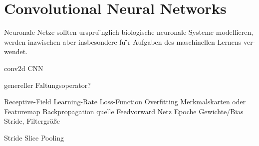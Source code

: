\section{Convolutional Neural Networks}
\label{convolutional_neural_networks}

Neuronale Netze sollten urspru ̈nglich biologische neuronale Systeme modellieren, werden inzwischen aber insbesondere fu ̈r Aufgaben des maschinellen Lernens ver- wendet.

\gls{conv2d}
\gls{CNN}

genereller Faltungsoperator?

Receptive-Field
Learning-Rate
Loss-Function
Overfitting
Merkmalskarten oder Featuremap
Backpropagation quelle
Feedvorward Netz
Epoche
Gewichte/Bias
Stride, Filtergröße

Stride Slice Pooling

